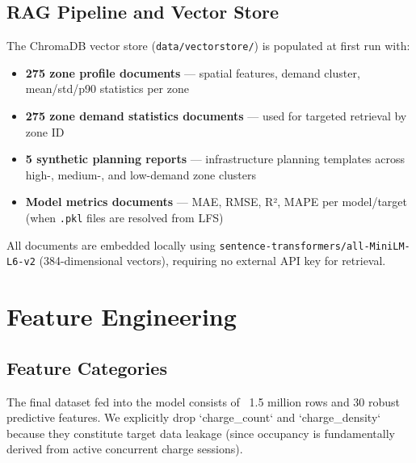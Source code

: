 \documentclass[12pt,a4paper]{article}
\begin{document}
\subsection{RAG Pipeline and Vector Store}

The ChromaDB vector store (\texttt{data/vectorstore/}) is populated at first run with:

\begin{itemize}[leftmargin=*]
  \item \textbf{275 zone profile documents} — spatial features, demand cluster,
        mean/std/p90 statistics per zone
  \item \textbf{275 zone demand statistics documents} — used for targeted retrieval by zone ID
  \item \textbf{5 synthetic planning reports} — infrastructure planning templates across
        high-, medium-, and low-demand zone clusters
  \item \textbf{Model metrics documents} — MAE, RMSE, R², MAPE per model/target
    (when \texttt{.pkl} files are resolved from LFS)
\end{itemize}

All documents are embedded locally using \texttt{sentence-transformers/all-MiniLM-L6-v2}
(384-dimensional vectors), requiring no external API key for retrieval.

\section{Feature Engineering}

\subsection{Feature Categories}

The final dataset fed into the model consists of ~1.5 million rows and 30 robust predictive features. We explicitly drop `charge_count` and `charge_density` because they constitute target data leakage (since occupancy is fundamentally derived from active concurrent charge sessions).
\end{document}
